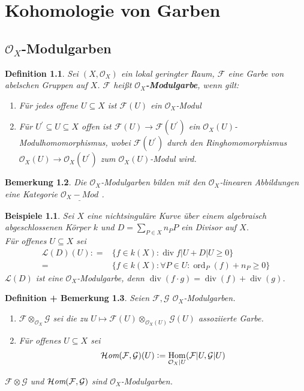 \documentclass[a4paper,oneside]{scrbook}
\theoremstyle{break}
\newtheorem{Def}{Definition}[section]
\newtheorem{DefBem}[Def]{Definition + Bemerkung}
\newtheorem{Bem}[Def]{Bemerkung}
\theoremstyle{nonumberbreak}
\newtheorem{nnBsp}{Beispiele}
\theoremstyle{nonumberplain}
\theoremstyle{break}
\newenvironment{iaufz}            
							{\renewcommand{\labelenumi}{(\roman{enumi})}            
							\renewcommand{\labelenumii}{(\roman{enumii})}
                \begin{enumerate}}
               {\end{enumerate}}
\newcommand{\emp}[1]{\textbf{\emph{#1}}}
\newcommand{\begriff}[1]{{\index{#1}}\emp{#1}}
\newcommand{\defeqr}[0]{\mathrel{\mathop:}=}
\newcommand{\Cat}[1]{%
	\ensuremath{\underline{#1}}%
}
\newcommand{\HomSheaf}{%
	\ensuremath{\operatorname{\mathcal H\emph{om}}}%
}
\DeclareMathOperator{\Hom}{Hom}
\DeclareMathOperator{\ord}{ord}
\renewcommand{\labelenumi}{\theenumi}
\renewcommand{\theenumi}{(\alph{enumi})}
\begin{document}

\chapter{Kohomologie von Garben}
\setcounter{section}{8}
\section{$\mathcal O_X$-Modulgarben}
\begin{Def}
  Sei $(X,\mathcal O_X)$ ein lokal geringter Raum, $\mathcal F$ eine Garbe von abelschen Gruppen auf $X$. 
  $\mathcal F$ heißt \begriff{$\mathcal O_X$-Modulgarbe}, wenn gilt:
  \begin{iaufz}
  \item Für jedes offene $U\subseteq X$ ist $\mathcal F(U)$ ein $\mathcal O_X$-Modul
  \item Für $U^\prime\subseteq U\subseteq X$ offen ist $\mathcal F(U)\to\mathcal F(U^\prime)$
    ein $\mathcal O_X(U)$-Modulhomomorphismus, wobei $\mathcal F(U^\prime)$ durch den Ringhomomorphismus
     $\mathcal O_X(U)\to\mathcal O_X(U^\prime)$ zum $\mathcal O_X(U)$-Modul wird.
  \end{iaufz}
\end{Def}

\begin{Bem}
  \label{bem:9.2}
  Die $\mathcal O_X$-Modulgarben bilden mit den $\mathcal O_X$-linearen Abbildungen eine Kategorie \Cat{\mathcal O_X-Mod}.
\end{Bem}

\begin{nnBsp}
  Sei $X$ eine nichtsinguläre Kurve über einem algebraisch abgeschlossenen Körper $k$
  und $D=\sum_{P\in X}n_PP$ ein Divisor auf $X$. \\
  Für offenes $U\subseteq X$ sei
  \begin{align*}
    \mathcal L(D)(U)\defeqr & \{f\in k(X):\operatorname{div} f\vert U+D\vert U \geq 0\} \\
    =& \{f\in k(X):\forall P\in U:\ord_P(f)+n_P\geq 0\}
  \end{align*}
  $\mathcal L(D)$ ist eine $\mathcal O_X$-Modulgarbe, denn $\operatorname{div}(f\cdot g)=\operatorname{div}(f)+\operatorname{div}(g)$.
\end{nnBsp}

\begin{DefBem}
  \label{defbem:9.3}
  Seien $\mathcal F,\mathcal G$ $\mathcal O_X$-Modulgarben.
  \begin{enumerate}
  \item $\mathcal F\otimes_{\mathcal O_X}\mathcal G$ sei die zu $U\mapsto \mathcal F(U)\otimes_{\mathcal O_X(U)}\mathcal G(U)$ assoziierte Garbe.
  \item Für offenes $U\subseteq X$ sei 
    \begin{align*}
      \HomSheaf(\mathcal F,\mathcal G)(U)\defeqr\Hom_{\mathcal O_X\vert U}(\mathcal F\vert U,\mathcal G\vert U)
    \end{align*}
  \end{enumerate}
  $\mathcal F\otimes\mathcal G$ und $\HomSheaf(\mathcal F,\mathcal G)$ sind $\mathcal O_X$-Modulgarben.
\end{DefBem}
\end{document}
